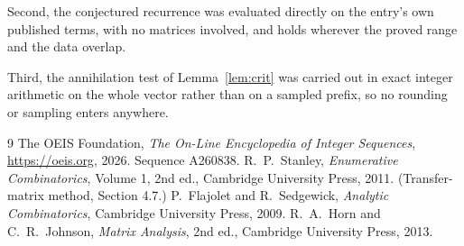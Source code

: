\documentclass[11pt,a4paper]{article}
\theoremstyle{plain}
\theoremstyle{definition}
\begin{document}
Second, the conjectured recurrence was evaluated directly on the entry's own published terms,
with no matrices involved, and holds wherever the proved range and the data overlap.

Third, the annihilation test of Lemma~\ref{lem:crit} was carried out in exact integer
arithmetic on the whole vector rather than on a sampled prefix, so no rounding or sampling
enters anywhere.

\begin{thebibliography}{9}
 The OEIS Foundation, \emph{The On-Line Encyclopedia of Integer
Sequences}, \url{https://oeis.org}, 2026. Sequence A260838.
 R.~P.~Stanley, \emph{Enumerative Combinatorics}, Volume 1, 2nd ed.,
Cambridge University Press, 2011. (Transfer-matrix method, Section 4.7.)
 P.~Flajolet and R.~Sedgewick, \emph{Analytic Combinatorics}, Cambridge
University Press, 2009.
 R.~A.~Horn and C.~R.~Johnson, \emph{Matrix Analysis}, 2nd ed., Cambridge
University Press, 2013.
\end{thebibliography}
\end{document}
